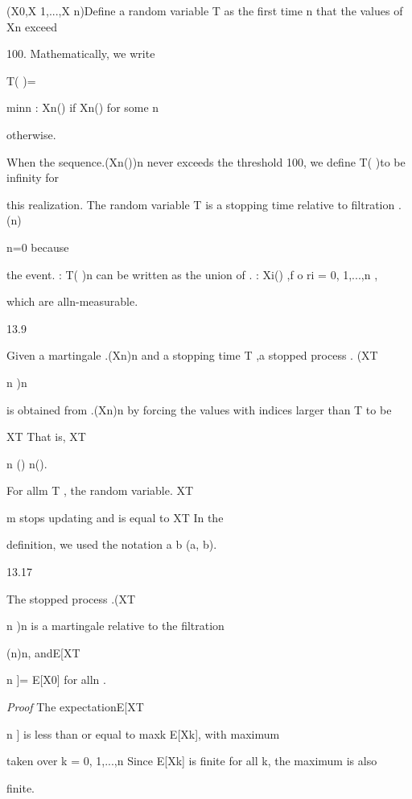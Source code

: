 \sigma(X0,X 1,...,X n)Define a random variable T as the first time n that the values of Xn exceed

100. Mathematically, we write

T( )=

{

min{n : Xn() } if Xn()  for some n

\infty otherwise.

When the sequence.(Xn())n never exceeds the threshold 100, we define T( )to be infinity for

this realization. The random variable T is a stopping time relative to filtration .(n)\infty

n=0 because

the event.{ : T( )\leq n} can be written as the union of .{ : Xi() },f o ri = 0, 1,...,n ,

which are alln-measurable.

\begin{defbox}{13.9}
\end{defbox}

Given a martingale .(Xn)n and a stopping time T ,a stopped process . (XT

n )n

is obtained from .(Xn)n by forcing the values with indices larger than T to be

XT That is, XT

n () \coloneqqXT n().

For allm \geq T , the random variable. XT

m stops updating and is equal to XT In the

definition, we used the notation a b \coloneqqmin(a, b).

\begin{thmbox}{13.17}
\end{thmbox}

The stopped process .(XT

n )n is a martingale relative to the filtration

(n)n, andE[XT

n ]= E[X0] for alln .

\textit{Proof} The expectationE[XT

n ] is less than or equal to maxk E[Xk], with maximum

taken over k = 0, 1,...,n Since E[Xk] is finite for all k, the maximum is also

finite.

}

